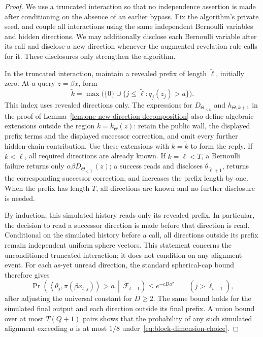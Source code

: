 \documentclass[11pt,a4paper]{article}
\newcommand{\inner}[2]{\left\langle #1,#2\right\rangle}
\theoremstyle{remark}
\begin{document}
\begin{proof}
We use a truncated interaction so that no independence assertion is made
after conditioning on the absence of an earlier bypass.  Fix the algorithm's
private seed, and couple all interactions using the same independent
Bernoulli variables and hidden directions.  We may additionally disclose
each Bernoulli variable after its call and disclose a new direction whenever
the augmented revelation rule calls for it.  These disclosures only
strengthen the algorithm.

In the truncated interaction, maintain a revealed prefix of length
$\widetilde\ell$, initially zero.  At a query $z=\beta x$, form
\[
 \widetilde k
 =\max\bigl(\{0\}\cup
       \{j\le\widetilde\ell:q_j(z_j)>a\}\bigr).
\]
This index uses revealed directions only.  The expressions for
$D_{\Theta_{\le k}}$ and $h_{\Theta,k+1}$ in the proof of
Lemma~\ref{lem:one-new-direction-decomposition} also define algebraic
extensions outside the region $k=k_\Theta(z)$: retain the public wall,
the displayed prefix terms and the displayed successor correction, and
omit every further hidden-chain contribution.  Use these extensions with
$k=\widetilde k$ to form the reply.  If
$\widetilde k<\widetilde\ell$, all required directions are already known.
If $\widetilde k=\widetilde\ell<T$, a Bernoulli failure returns only
$\alpha\beta D_{\Theta_{\le\widetilde\ell}}(z)$; a success reads and
discloses $\theta_{\widetilde\ell+1}$, returns the corresponding successor
correction, and increases the prefix length by one.  When the prefix has
length $T$, all directions are known and no further disclosure is needed.

By induction, this simulated history reads only its revealed prefix.
In particular, the decision to read a successor direction is made before
that direction is read.  Conditional on the simulated history before a
call, all directions outside its prefix remain independent uniform sphere
vectors.  This statement concerns the unconditioned truncated interaction;
it does not condition on any alignment event.  For each as-yet unread
direction, the standard spherical-cap bound therefore gives
\[
 \Pr\!\left(
   \inner{\theta_j}{\pi(\beta\widetilde x_{t,j})}>a
   \,\middle|\,\widetilde{\mathcal F}_{t-1}
 \right)
 \le e^{-cDa^2}
 \qquad(j>\widetilde\ell_{t-1}),
\]
after adjusting the universal constant for $D\ge2$.
The same bound holds for the simulated final output and each direction
outside its final prefix.  A union bound over at most $T(Q+1)$ pairs shows
that the probability of any such simulated alignment exceeding $a$ is at
most $1/8$ under~\eqref{eq:block-dimension-choice}.


\end{proof}
\end{document}
